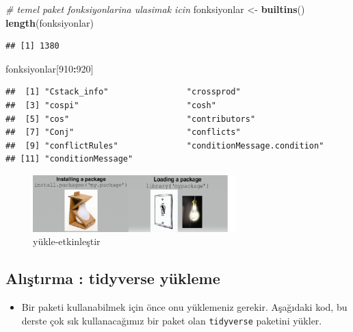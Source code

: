 \documentclass[
  oneside]{book}
\newenvironment{Shaded}{\begin{snugshade}}{\end{snugshade}}
\newcommand{\CommentTok}[1]{\textcolor[rgb]{0.56,0.35,0.01}{\textit{#1}}}
\newcommand{\DecValTok}[1]{\textcolor[rgb]{0.00,0.00,0.81}{#1}}
\newcommand{\FunctionTok}[1]{\textcolor[rgb]{0.13,0.29,0.53}{\textbf{#1}}}
\newcommand{\NormalTok}[1]{#1}
\newcommand{\OtherTok}[1]{\textcolor[rgb]{0.56,0.35,0.01}{#1}}
\newcommand{\SpecialCharTok}[1]{\textcolor[rgb]{0.81,0.36,0.00}{\textbf{#1}}}
\providecommand{\tightlist}{%
  \setlength{\itemsep}{0pt}\setlength{\parskip}{0pt}}
\begin{document}
\begin{Shaded}
\begin{Highlighting}[]
\CommentTok{\# temel paket fonksiyonlarina ulasimak icin  }
\NormalTok{fonksiyonlar }\OtherTok{\textless{}{-}}  \FunctionTok{builtins}\NormalTok{()}
\FunctionTok{length}\NormalTok{(fonksiyonlar)}
\end{Highlighting}
\end{Shaded}

\begin{verbatim}
## [1] 1380
\end{verbatim}

\begin{Shaded}
\begin{Highlighting}[]
\NormalTok{fonksiyonlar[}\DecValTok{910}\SpecialCharTok{:}\DecValTok{920}\NormalTok{]}
\end{Highlighting}
\end{Shaded}

\begin{verbatim}
##  [1] "Cstack_info"                "crossprod"                 
##  [3] "cospi"                      "cosh"                      
##  [5] "cos"                        "contributors"              
##  [7] "Conj"                       "conflicts"                 
##  [9] "conflictRules"              "conditionMessage.condition"
## [11] "conditionMessage"
\end{verbatim}

\begin{figure}
\centering
\includegraphics[width=0.7\textwidth,height=\textheight]{images/packagebulb.png}
\caption{yükle-etkinleştir}
\end{figure}

\hypertarget{alux131ux15ftux131rma-tidyverse-yuxfckleme}{%
\subsection{Alıştırma : tidyverse yükleme}\label{alux131ux15ftux131rma-tidyverse-yuxfckleme}}

\begin{itemize}
\tightlist
\item
  Bir paketi kullanabilmek için önce onu yüklemeniz gerekir. Aşağıdaki kod, bu derste çok sık kullanacağımız bir paket olan \texttt{tidyverse} paketini yükler.
\end{itemize}
\end{document}
